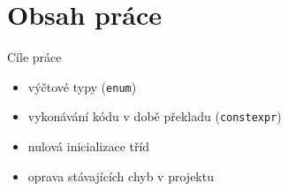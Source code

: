 \documentclass[11pt]{beamer}
\begin{document}
\section{Obsah práce}








\begin{frame}{Cíle práce}
\begin{itemize}
\pause \item výčtové typy (\texttt{enum})
\pause \item vykonávání kódu v době překladu (\texttt{constexpr})
\pause \item nulová inicializace tříd
\pause \item oprava stávajících chyb v projektu
\end{itemize}
\end{frame}
\end{document}
